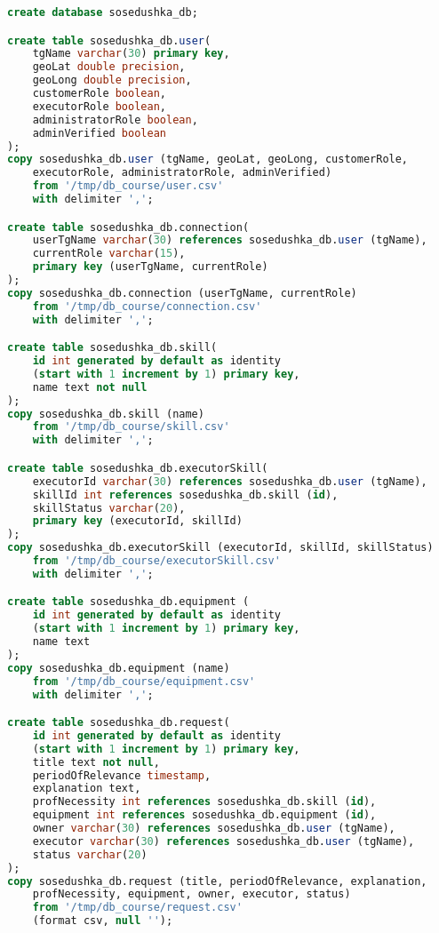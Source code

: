 
\captionsetup{singlelinecheck=false, justification=raggedright}
\begin{lstlisting}[language=sql, caption=Создание и заполнение базы данных]
create database sosedushka_db;

create table sosedushka_db.user(
	tgName varchar(30) primary key,
	geoLat double precision,
	geoLong double precision,
	customerRole boolean, 
	executorRole boolean, 
	administratorRole boolean,
	adminVerified boolean
);
copy sosedushka_db.user (tgName, geoLat, geoLong, customerRole, 
	executorRole, administratorRole, adminVerified) 
	from '/tmp/db_course/user.csv'
	with delimiter ',';

create table sosedushka_db.connection(
	userTgName varchar(30) references sosedushka_db.user (tgName),
	currentRole varchar(15),
	primary key (userTgName, currentRole)
);
copy sosedushka_db.connection (userTgName, currentRole)
	from '/tmp/db_course/connection.csv'
	with delimiter ',';

create table sosedushka_db.skill(
	id int generated by default as identity 
	(start with 1 increment by 1) primary key,
	name text not null
);
copy sosedushka_db.skill (name) 
	from '/tmp/db_course/skill.csv'
	with delimiter ',';

create table sosedushka_db.executorSkill(
	executorId varchar(30) references sosedushka_db.user (tgName), 
	skillId int references sosedushka_db.skill (id),
	skillStatus varchar(20),
	primary key (executorId, skillId)
);
copy sosedushka_db.executorSkill (executorId, skillId, skillStatus) 
	from '/tmp/db_course/executorSkill.csv'
	with delimiter ',';

create table sosedushka_db.equipment (
	id int generated by default as identity 
	(start with 1 increment by 1) primary key,
	name text
);
copy sosedushka_db.equipment (name) 
	from '/tmp/db_course/equipment.csv'
	with delimiter ',';

create table sosedushka_db.request(
	id int generated by default as identity 
	(start with 1 increment by 1) primary key,
	title text not null,
	periodOfRelevance timestamp,
	explanation text,
	profNecessity int references sosedushka_db.skill (id),
	equipment int references sosedushka_db.equipment (id),
	owner varchar(30) references sosedushka_db.user (tgName),
	executor varchar(30) references sosedushka_db.user (tgName),
	status varchar(20)
);
copy sosedushka_db.request (title, periodOfRelevance, explanation, 	
	profNecessity, equipment, owner, executor, status)
	from '/tmp/db_course/request.csv'
	(format csv, null '');


\end{lstlisting}
